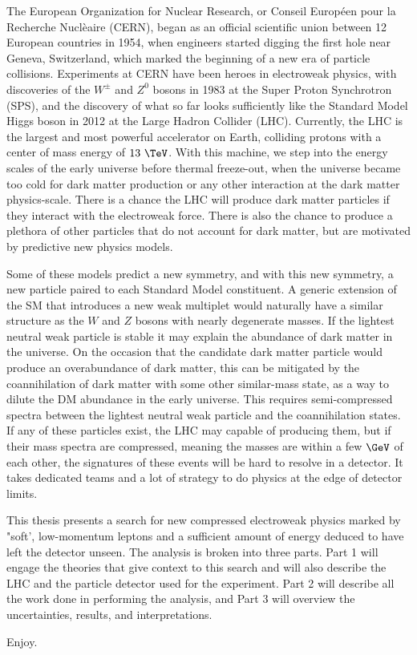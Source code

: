 The European Organization for Nuclear Research, or Conseil Europ\'een pour la Recherche Nucl\`eaire (CERN), began as an official scientific union between 12 European countries in 1954, when engineers started digging the first hole near Geneva, Switzerland, which marked the beginning of a new era of particle collisions.  Experiments at CERN have been heroes in electroweak physics, with discoveries of the $W^\pm$ and $Z^0$ bosons in 1983 at the Super Proton Synchrotron (SPS), and the discovery of what so far looks sufficiently like the Standard Model Higgs boson in 2012 at the Large Hadron Collider (LHC).  Currently, the LHC is the largest and most powerful accelerator on Earth, colliding protons with a center of mass energy of $13~\TeV$.  With this machine, we step into the energy scales of the early universe before thermal freeze-out, when the universe became too cold for dark matter production or any other interaction at the dark matter physics-scale.  There is a chance the LHC will produce dark matter particles if they interact with the electroweak force.  There is also the chance to produce a plethora of other particles that do not account for dark matter, but are motivated by predictive new physics models. 

Some of these models predict a new symmetry, and with this new symmetry, a new particle paired to each Standard Model constituent.  A generic extension of the SM that introduces a new weak multiplet would naturally have a similar structure as the $W$ and $Z$ bosons with nearly degenerate masses.  If the lightest neutral weak particle is stable it may explain the abundance of dark matter in the universe.  On the occasion that the candidate dark matter particle would produce an overabundance of dark matter, this can be mitigated by the coannihilation of dark matter with some other similar-mass state, as a way to dilute the DM abundance in the early universe.  This requires semi-compressed spectra between the lightest neutral weak particle and the coannihilation states.  If any of these particles exist, the LHC may capable of producing them, but if their mass spectra are compressed, meaning the masses are within a few $\GeV$ of each other, the signatures of these events will be hard to resolve in a detector.  It takes dedicated teams and a lot of strategy to do physics at the edge of detector limits. 

This thesis presents a search for new compressed electroweak physics marked by "soft', low-momentum leptons and a sufficient amount of energy deduced to have left the detector unseen.  The analysis is broken into three parts.  Part 1 will engage the theories that give context to this search and will also describe the LHC and the particle detector used for the experiment.  Part 2 will describe all the work done in performing the analysis, and Part 3 will overview the uncertainties, results, and interpretations.

Enjoy.







